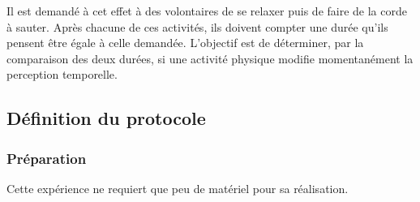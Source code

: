 \documentclass[12pt,fleqn,oneside,french,openany]{book} %
\begin{document}
Il est demandé à cet effet à des volontaires de se relaxer puis de faire de la corde à sauter. Après chacune de ces activités, ils doivent compter une durée qu'ils pensent être égale à celle demandée. L'objectif est de déterminer, par la comparaison des deux durées, si une activité physique modifie momentanément la perception temporelle.

\subsection{Définition du protocole} \label{ssec:defProto2.1}

\subsubsection{Préparation} \label{sssec:preparation2.1}
Cette expérience ne requiert que peu de matériel pour sa réalisation.
\end{document}
